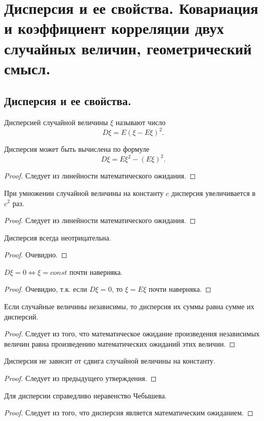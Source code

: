 \section{Дисперсия и ее свойства. Ковариация и коэффициент корреляции двух случайных величин, геометрический смысл.}

\subsection{Дисперсия и ее свойства.}
\begin{definition}
    Дисперсией случайной величины $\xi$ называют число
    \[
        D \xi = E(\xi - E \xi)^2.
    \]
\end{definition}
\begin{statement}
    Дисперсия может быть вычислена по формуле
    \[
        D \xi = E \xi^2 - (E \xi)^2.
    \]
    \begin{proof}
        Следует из линейности математического ожидания.
    \end{proof}
\end{statement}
\begin{statement}
    При умножении случайной величины на константу $c$ дисперсия увеличивается в $c^2$ раз.
    \begin{proof}
        Следует из линейности математического ожидания.
    \end{proof}
\end{statement}
\begin{statement}
    Дисперсия всегда неотрицательна.
    \begin{proof}
        Очевидно.
    \end{proof}
\end{statement}
\begin{statement}
    $D \xi = 0 \Leftrightarrow \xi = const$ почти наверняка.
    \begin{proof}
        Очевидно, т.к. если $D \xi = 0$, то $\xi = E \xi$ почти наверняка.
    \end{proof}
\end{statement}
\begin{statement}
    Если случайные величины независимы, то дисперсия их суммы равна сумме их дисперсий.
    \begin{proof}
        Следует из того, что математическое ожидание произведения независимых величин равна произведению математических ожиданий этих величин.
    \end{proof}
\end{statement}
\begin{statement}
    Дисперсия не зависит от сдвига случайной величины на константу.
    \begin{proof}
        Следует из предыдущего утверждения.
    \end{proof}
\end{statement}
\begin{statement}
    Для дисперсии справедливо неравенство Чебышева.
    \begin{proof}
        Следует из того, что дисперсия является математическим ожиданием.
    \end{proof}
\end{statement}

